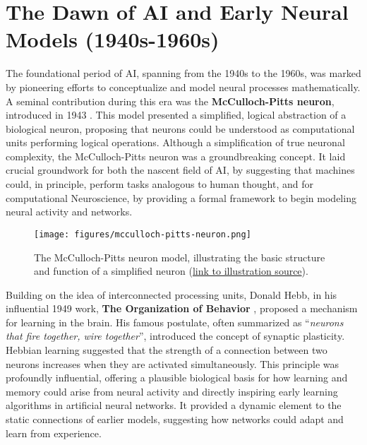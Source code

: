 \section{The Dawn of AI and Early Neural Models (1940s-1960s)}

The foundational period of AI, spanning from the 1940s to the 1960s, was marked by pioneering efforts to conceptualize and model neural processes mathematically. A seminal contribution during this era was the \textbf{McCulloch-Pitts neuron}, introduced in 1943 \cite{mcculloch1943logical}. This model presented a simplified, logical abstraction of a biological neuron, proposing that neurons could be understood as computational units performing logical operations. Although a simplification of true neuronal complexity, the McCulloch-Pitts neuron was a groundbreaking concept. It laid crucial groundwork for both the nascent field of AI, by suggesting that machines could, in principle, perform tasks analogous to human thought, and for computational Neuroscience, by providing a formal framework to begin modeling neural activity and networks.

\begin{figure}[H]
    \centering
    \texttt{[image: figures/mcculloch-pitts-neuron.png]}
    \caption{The McCulloch-Pitts neuron model, illustrating the basic structure and function of a simplified neuron (\href{https://www.analyticsvidhya.com/blog/2024/07/mcculloch-pitts-neuron/}{link to illustration source}).}
    \label{fig:mcculloch-pitts-neuron}
\end{figure}

Building on the idea of interconnected processing units, Donald Hebb, in his influential 1949 work, \textbf{The Organization of Behavior} \cite{hebb1949organization}, proposed a mechanism for learning in the brain. His famous postulate, often summarized as ``\textit{neurons that fire together, wire together}'', introduced the concept of synaptic plasticity. Hebbian learning suggested that the strength of a connection between two neurons increases when they are activated simultaneously. This principle was profoundly influential, offering a plausible biological basis for how learning and memory could arise from neural activity and directly inspiring early learning algorithms in artificial neural networks. It provided a dynamic element to the static connections of earlier models, suggesting how networks could adapt and learn from experience.

